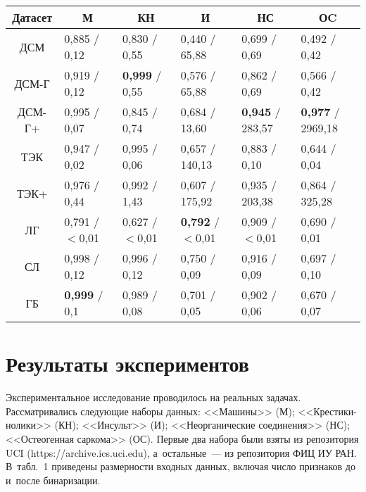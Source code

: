 \begin{multicols}{2}
\begin{table*}\small %
\begin{center}
\vspace*{2ex}

\begin{tabular}{|c|l|l|l|l|l|}
\hline
Датасет&\multicolumn{1}{c|}{М}&\multicolumn{1}{c|}{КН}&\multicolumn{1}{c|}{И}&\multicolumn{1}{c|}{НС}&\multicolumn{1}{c|}{ОC}\\
\hline
ДСМ&0,885 / 0,12&0,830 / 0,55&0,440 / 65,88&0,699 / 0,69&0,492 / 0,42\\
ДСМ-Г&0,919 / 0,12&\textbf{0,999} / 0,55&0,576 / 65,88&0,862 / 0,69&0,566 / 0,42\\
ДСМ-Г+&0,995 / 0,07&0,845 / 0,74&0,684 / 13,60&\textbf{0,945} / 283,57&\textbf{0,977} / 2969,18\\
ТЭК&0,947 / 0,02&0,995 / 0,06&0,657 / 140,13&0,883 / 0,10&0,644 / 0,04\\
ТЭК+&0,976 / 0,44&0,992 / 1,43&0,607 / 175,92&0,935 / 203,38&0,864 / 325,28\\
ЛГ&0,791 / $<$0,01&0,627 / $<$0,01&\textbf{0,792} / $<$0,01&0,909 / $<$0,01&0,690 / 0,01\\
СЛ&0,998 / 0,12&0,996 / 0,12&0,750 / 0,09&0,916 / 0,09&0,697 / 0,10\\
ГБ&\textbf{0,999} / 0,1&0,989 / 0,08&0,701 / 0,05&0,902 / 0,06&0,670 / 0,07\\
\hline
\end{tabular}
\end{center}
\vspace*{-6pt}
\end{table*}

\vspace*{-6pt}

\section{Результаты экспериментов}

\vspace*{-3pt}

  Экспериментальное исследование проводилось на реальных задачах. 
Рассматривались следующие наборы данных: <<Машины>> (М); <<Крес\-ти\-ки-но\-ли\-ки>> (КН); <<Инсульт>> (И); <<Неорганические соединения>> (НС); 
<<Остеогенная саркома>> (ОС). Первые два набора были взяты из репозитория 
UCI ({\sf https://archive.ics.uci.edu}), а~остальные~--- из репозитория ФИЦ ИУ РАН. 
В~табл.~1 приведены размерности входных данных, включая число признаков 
до и~после бинаризации. 
  



\end{multicols}
